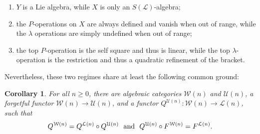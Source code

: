 \documentclass[11pt]{amsart} \renewcommand{\baselinestretch}{1.2}
\theoremstyle{plain}
\newtheorem{cor}[thm]{Corollary}
\numberwithin{equation}{section} %
\theoremstyle{plain}
\newtheorem{cor}[thm]{Corollary}
\numberwithin{equation}{chapter} %
\renewcommand{\to}{\longrightarrow}
\newcommand{\scrL}{\mathscr{L}}
\newcommand{\calU}{\mathcal{U}}
\newcommand{\calL}{\mathcal{L}}
\newcommand{\calw}{\mathcal{W}}
\newcommand{\LieOperad}{{\scrL}}
\begin{document}
\begin{homotopy operations for PRLs}
\begin{enumerate}
\item $Y$ is a  Lie algebra, while $X$ is only an $S(\LieOperad)$-algebra;
\item the $P$-operations on $X$ are always defined and vanish when out of range, while the $\lambda$ operations are simply undefined when out of range;
\item the top $P$-operation is the self square and thus is linear, while the top $\lambda$-operation is the restriction and thus a quadratic refinement of the bracket.
\end{enumerate}
Nevertheless, these two regimes share at least the following common ground:
\begin{cor}
\label{indec functors common ground 0 and n}
For all $n\geq0$, there are algebraic categories $\calw(n)$ and $\calU(n)$, a forgetful functor $\calw(n)\to\calU(n)$, and a functor $Q^{\calU(n)}:\calw(n)\to \calL(n)$, such that
\[Q^{\calw(n)}=Q^{\calL(n)}\circ Q^{\calU(n)}\textup{\ \ and\ \ }Q^{\calU(n)}\circ F^{\calw(n)}=F^{\calL(n)}.\]
\end{cor}



\end{homotopy operations for PRLs}
\end{document}
